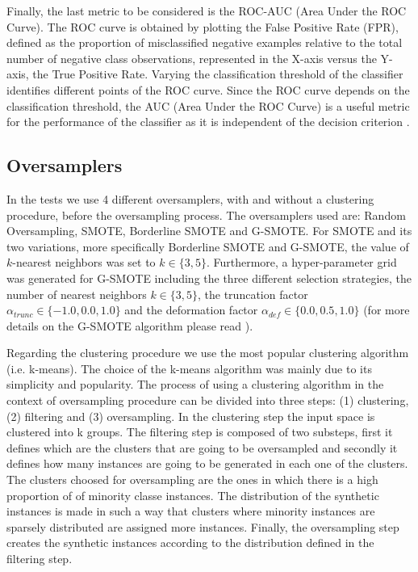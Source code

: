 \documentclass[parskip=full]{scrartcl}
\begin{document}
Finally, the last metric to be considered is the ROC-AUC (Area Under the ROC 
Curve). The ROC curve is obtained by plotting the False Positive Rate (FPR), 
defined as the proportion of misclassified negative examples relative to the 
total number of negative class observations, represented in the X-axis versus 
the Y-axis, the True Positive Rate. Varying the classification threshold of the 
classifier identifies different points of the ROC curve. Since the ROC curve 
depends on the classification threshold, the AUC (Area Under the ROC Curve) is 
a useful metric for the performance of the classifier as it is independent of 
the decision criterion \cite{He2009}.

\subsection{Oversamplers}

In the tests we use 4 different oversamplers, with and without a clustering 
procedure, before the oversampling process. The oversamplers used are: Random 
Oversampling, SMOTE, Borderline SMOTE and G-SMOTE. For SMOTE and its two 
variations, more specifically Borderline SMOTE and G-SMOTE, the value of 
$k$-nearest neighbors was set to $k \in \{3, 5\}$. Furthermore, a 
hyper-parameter grid was generated for G-SMOTE including the three different 
selection strategies, the number of nearest neighbors $k \in \{3, 5\}$, the 
truncation factor $\alpha_{trunc} \in \{-1.0, 0.0, 1.0\}$ and the deformation 
factor $\alpha_{def} \in \{0.0, 0.5, 1.0\}$ (for more details on the G-SMOTE 
algorithm please read \cite{Douzas2019}). 

Regarding the clustering procedure we use the most popular clustering algorithm 
(i.e. k-means). The choice of the k-means algorithm was mainly due to its 
simplicity and popularity. The process of using a clustering algorithm in the 
context of oversampling procedure can be divided into three steps: (1) 
clustering, (2) filtering and (3) oversampling. In the clustering step the 
input space is clustered into k groups. The filtering step is composed of two 
substeps, first it defines which are the clusters that are going to be 
oversampled and secondly it defines how many instances are going to be 
generated in each one of the clusters. The clusters choosed for oversampling 
are the ones in which there is a high proportion of of minority classe 
instances. The distribution of the synthetic instances is made in such a way 
that clusters where minority instances are sparsely distributed are assigned 
more instances. Finally, the oversampling step creates the synthetic instances 
according to the distribution defined in the filtering step.  
\end{document}
